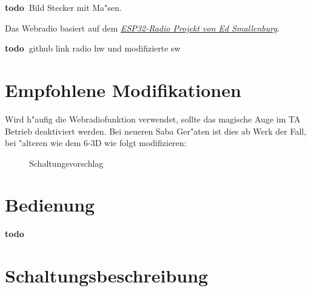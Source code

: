 \documentclass[ngerman,11pt,parskip=half] {scrartcl}
\newcommand {\todo} {\textbf{\color{red} todo\ }}
\begin{document}
\todo Bild Stecker mit Ma"sen.

Das Webradio basiert auf dem \emph{\href{https://github.com/Edzelf/ESP32-Radio}{ESP32-Radio Projekt von Ed Smallenburg}}.

\todo github link radio hw und modifizierte sw


\section{Empfohlene Modifikationen} \label{sec:mod}

Wird h"aufig die Webradiofunktion verwendet, sollte das magische Auge im TA Betrieb deaktiviert werden. Bei neueren Saba Ger"aten ist dies ab Werk der Fall, bei "alteren wie dem 6-3D wie folgt modifizieren:

\begin{figure}[H]
\centering
{}
\caption{Schaltungsvorschlag } \label{fig:1}
\end{figure}

\section{Bedienung} \label{sec:bedienung}

\todo

\section{Schaltungsbeschreibung} \label{sec:schaltung}
\end{document}
